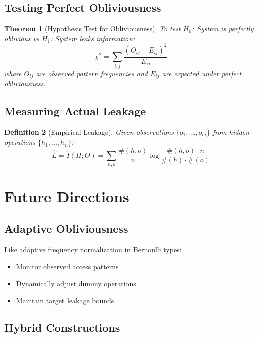 \documentclass[11pt,final]{article}
\newtheorem{theorem}{Theorem}[section]
\newtheorem{definition}[theorem]{Definition}
\begin{document}
\subsection{Testing Perfect Obliviousness}

\begin{theorem}[Hypothesis Test for Obliviousness]
To test $H_0$: System is perfectly oblivious vs $H_1$: System leaks information:
\begin{equation}
\chi^2 = \sum_{i,j} \frac{(O_{ij} - E_{ij})^2}{E_{ij}}
\end{equation}
where $O_{ij}$ are observed pattern frequencies and $E_{ij}$ are expected under perfect obliviousness.
\end{theorem}

\subsection{Measuring Actual Leakage}

\begin{definition}[Empirical Leakage]
Given observations $\{o_1, ..., o_m\}$ from hidden operations $\{h_1, ..., h_n\}$:
\begin{equation}
\hat{L} = \hat{I}(H; O) = \sum_{h,o} \frac{\#(h,o)}{n} \log \frac{\#(h,o) \cdot n}{\#(h) \cdot \#(o)}
\end{equation}
\end{definition}

\section{Future Directions}

\subsection{Adaptive Obliviousness}

Like adaptive frequency normalization in Bernoulli types:
\begin{itemize}
\item Monitor observed access patterns
\item Dynamically adjust dummy operations
\item Maintain target leakage bounds
\end{itemize}

\subsection{Hybrid Constructions}
\end{document}
